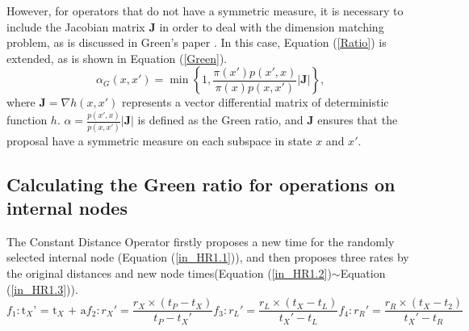 \documentclass{bmcart}
\begin{document}
\begin{backmatter}
However, for operators that do not have a symmetric measure, it is necessary to include the Jacobian matrix ${\mathbf{J}}$  in order to deal with the dimension matching problem, as is discussed in Green's paper \cite{green1995reversible}. In this case, Equation (\ref{Ratio}) is extended, as is shown in Equation (\ref{Green}).
\begin{equation}\label{Green}
{\alpha_G}(x, x') = \min \left\{ {1,\frac{{\pi (x'){p}(x',x)}}{{\pi (x){p}(x,x')}}}\left|{\mathbf{J}}\right| \right\} \text{,}
\end{equation}
where ${\mathbf{J}} = {\nabla h(x, x')}$ represents a vector differential matrix of deterministic function $h$. $\alpha = \frac{{p}(x',x)}{{p}(x,x')}\left|{\mathbf{J}}\right|$ is defined as the Green ratio, and ${\mathbf{J}}$ ensures that the proposal have a symmetric measure on each subspace in state $x$ and $x'$.

\subsection*{Calculating the Green ratio for operations on internal nodes}
The Constant Distance Operator firstly proposes a new time for the randomly selected internal node (Equation (\ref{in_HR1.1})), and then proposes three rates by the original distances and new node times(Equation (\ref{in_HR1.2})$\sim$Equation (\ref{in_HR1.3})).
\begin{subequations}\label{in_HR1}
\begin{equation}\label{in_HR1.1}
{f_1}:{{\text{t}}_X}{\text{'  =  }}{{\text{t}}_X}{\text{  +  a}}
\end{equation}
\begin{equation}\label{in_HR1.2}
{f_2}:{r_X}' = \frac{{{r_X} \times ({t_P} - {t_X})}}{{{t_P} - {t_X}'}}
\end{equation}
\begin{equation}
{f_3}:{r_L}' = \frac{{{r_L} \times ({t_X} - {t_L})}}{{{t_X}' - {t_L}}}
\end{equation}
\begin{equation}\label{in_HR1.3}
{f_4}:{r_R}' = \frac{{{r_R} \times ({t_X} - {t_2})}}{{{t_X}' - {t_R}}}
\end{equation}
\end{subequations}


\end{backmatter}
\end{document}
